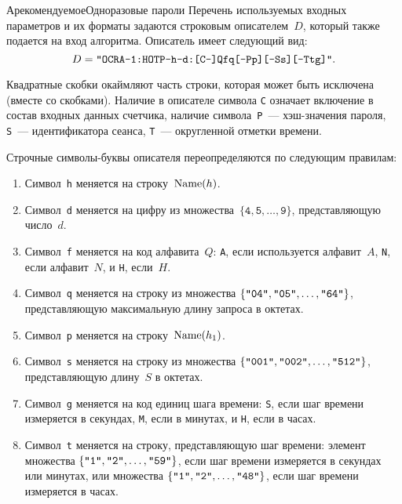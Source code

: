 \begin{appendix}{А}{рекомендуемое}{Одноразовые пароли}
Перечень используемых входных параметров и их форматы задаются 
строковым описателем~$D$, который также подается на вход алгоритма.
%
Описатель имеет следующий вид:
$$
D=\texttt{\textquotedbl 
OCRA-1:HOTP-h-d:[C-]Qfq[-Pp][-Ss][-Ttg]\textquotedbl}.
$$

Квадратные скобки окаймляют часть строки, которая может быть 
исключена (вместе со скобками).
Наличие в описателе символа \texttt{C} означает включение в состав входных данных 
счетчика, наличие символа~\texttt{P}~--- хэш-значения пароля,
\texttt{S}~--- идентификатора сеанса, \texttt{T}~---
округленной отметки времени.

Строчные символы-буквы описателя переопределяются по следующим правилам:
%
\begin{enumerate}
\item
Символ~\texttt{h} меняется на строку~$\text{Name}(h)$.
\item
Символ~\texttt{d} меняется на цифру из 
множества~$\{\texttt{4},\texttt{5},\ldots,\texttt{9}\}$,  
представляющую число~$d$.
\item
Символ~\texttt{f} меняется на код алфавита~$Q$:
\texttt{A}, если используется алфавит~$A$, 
\texttt{N}, если алфавит~$N$, и \texttt{H}, если~$H$.
\item
Символ~\texttt{q} меняется на строку из множества 
$\{\texttt{\textquotedbl 04\textquotedbl},
\texttt{\textquotedbl 05\textquotedbl},\ldots,
\texttt{\textquotedbl 64\textquotedbl}\}$,
представляющую максимальную длину запроса в октетах.
\item
Символ~\texttt{p} меняется на строку~$\text{Name}(h_1)$.
\item
Символ~\texttt{s} меняется на строку из множества
$\{\texttt{\textquotedbl 001\textquotedbl},
\texttt{\textquotedbl 002\textquotedbl},\ldots,
\texttt{\textquotedbl 512\textquotedbl}\}$,
представляющую длину~$S$ в октетах.
\item
Символ~\texttt{g} меняется на код единиц шага времени:
\texttt{S}, если шаг времени измеряется в секундах, 
\texttt{M}, если в минутах, и \texttt{H}, если в часах.
\item
Символ~\texttt{t} меняется на строку,
представляющую шаг времени:
элемент множества 
$\{\texttt{\textquotedbl 1\textquotedbl},
\texttt{\textquotedbl 2\textquotedbl},\ldots,
\texttt{\textquotedbl 59\textquotedbl}\}$,
если шаг времени измеряется в секундах или минутах,
или множества $\{\texttt{\textquotedbl 1\textquotedbl},
\texttt{\textquotedbl 2\textquotedbl},\ldots,
\texttt{\textquotedbl 48\textquotedbl}\}$,
если шаг времени измеряется в часах.
\end{enumerate}


\end{appendix}
